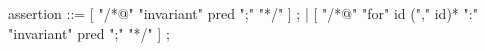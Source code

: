 \begin{syntax}
  assertion ::= [ "/*@" "invariant" pred ";" "*/" ] ;
  | [ "/*@" "for" id ("," id)* ":" "invariant" pred ";" "*/" ] ;
\end{syntax}
